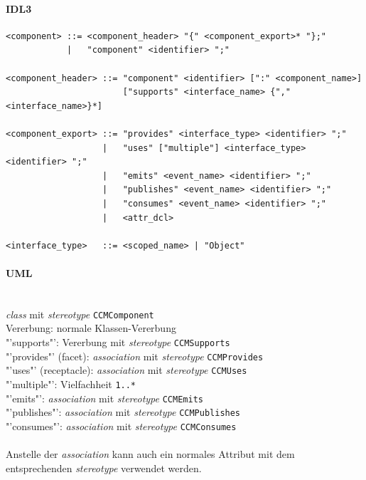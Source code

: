 \documentclass [a4paper,10pt] {scrartcl}
\begin{document}
\paragraph{IDL3}
\begin{verbatim}
<component> ::= <component_header> "{" <component_export>* "};"
            |   "component" <identifier> ";"

<component_header> ::= "component" <identifier> [":" <component_name>]
                       ["supports" <interface_name> {"," <interface_name>}*]

<component_export> ::= "provides" <interface_type> <identifier> ";"
                   |   "uses" ["multiple"] <interface_type> <identifier> ";"
                   |   "emits" <event_name> <identifier> ";"
                   |   "publishes" <event_name> <identifier> ";"
                   |   "consumes" <event_name> <identifier> ";"
                   |   <attr_dcl>

<interface_type>   ::= <scoped_name> | "Object"
\end{verbatim}
\paragraph{UML}~\\
\emph{class} mit \emph{stereotype} \texttt{CCMComponent}\\
Vererbung: normale Klassen-Vererbung\\
"'supports"': Vererbung mit \emph{stereotype} \texttt{CCMSupports}\\
"'provides"' (\textsf{facet}): \emph{association} mit \emph{stereotype} \texttt{CCMProvides}\\
"'uses"' (\textsf{receptacle}): \emph{association} mit \emph{stereotype} \texttt{CCMUses}\\
"'multiple"': Vielfachheit \texttt{1..*}\\
"'emits"': \emph{association} mit \emph{stereotype} \texttt{CCMEmits}\\
"'publishes"': \emph{association} mit \emph{stereotype} \texttt{CCMPublishes}\\
"'consumes"': \emph{association} mit \emph{stereotype} \texttt{CCMConsumes}\\
~\\
Anstelle der \emph{association} kann auch ein normales Attribut mit dem
entsprechenden \emph{stereotype} verwendet werden.
\newpage
\end{document}
